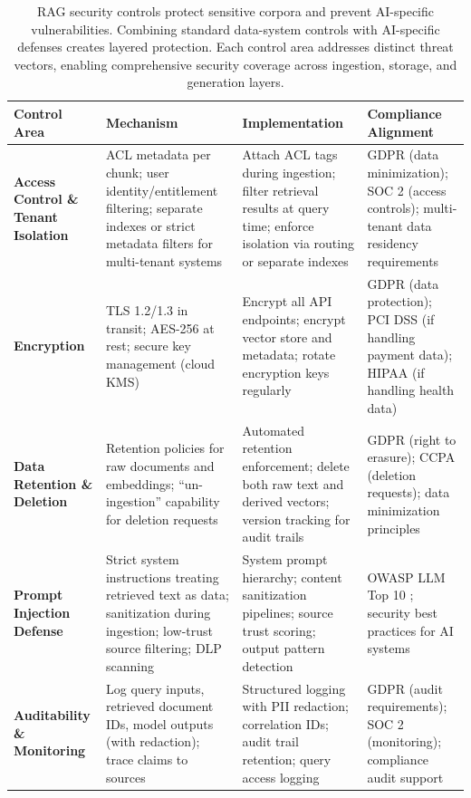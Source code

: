 \begin{table}[tb]
\centering
\small
\caption{RAG security controls protect sensitive corpora and prevent AI-specific vulnerabilities. Combining standard data-system controls with AI-specific defenses creates layered protection. Each control area addresses distinct threat vectors, enabling comprehensive security coverage across ingestion, storage, and generation layers.}
\label{tab:ch08_security_controls}
\setlength{\tabcolsep}{6pt}
\renewcommand{\arraystretch}{1.3}
\begin{tabularx}{\linewidth}{@{}>{\raggedright\arraybackslash}p{3cm}>{\raggedright\arraybackslash}X>{\raggedright\arraybackslash}X>{\raggedright\arraybackslash}X@{}}
\toprule
\rowcolor{gray!15}
\textbf{Control Area} & \textbf{Mechanism} & \textbf{Implementation} & \textbf{Compliance Alignment} \\
\midrule
\textbf{Access Control \& Tenant Isolation} & ACL metadata per chunk; user identity/entitlement filtering; separate indexes or strict metadata filters for multi-tenant systems & Attach ACL tags during ingestion; filter retrieval results at query time; enforce isolation via routing or separate indexes & GDPR (data minimization); SOC 2 (access controls); multi-tenant data residency requirements \\
\addlinespace[1pt]
\textbf{Encryption} & TLS 1.2/1.3 in transit; AES-256 at rest; secure key management (cloud KMS) & Encrypt all API endpoints; encrypt vector store and metadata; rotate encryption keys regularly & GDPR (data protection); PCI DSS (if handling payment data); HIPAA (if handling health data) \\
\addlinespace[1pt]
\textbf{Data Retention \& Deletion} & Retention policies for raw documents and embeddings; ``un-ingestion'' capability for deletion requests & Automated retention enforcement; delete both raw text and derived vectors; version tracking for audit trails & GDPR (right to erasure); CCPA (deletion requests); data minimization principles \\
\addlinespace[1pt]
\textbf{Prompt Injection Defense} & Strict system instructions treating retrieved text as data; sanitization during ingestion; low-trust source filtering; DLP scanning & System prompt hierarchy; content sanitization pipelines; source trust scoring; output pattern detection & OWASP LLM Top 10 \cite{OWASP2024LLMTop10}; security best practices for AI systems \\
\addlinespace[1pt]
\textbf{Auditability \& Monitoring} & Log query inputs, retrieved document IDs, model outputs (with redaction); trace claims to sources & Structured logging with PII redaction; correlation IDs; audit trail retention; query access logging & GDPR (audit requirements); SOC 2 (monitoring); compliance audit support \\

\end{tabularx}
\end{table}
